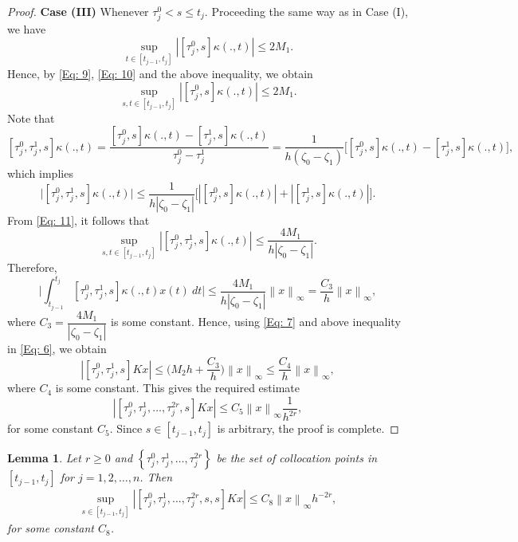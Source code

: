 \documentclass[sn-mathphys-num]{sn-jnl}%
\theoremstyle{thmstyleone}%
\theoremstyle{thmstyletwo}%
\theoremstyle{thmstylethree}%
\newcommand{\norm}[1]{\left\lVert #1\right\rVert}
\newtheorem{lemma}{\bf Lemma}[section]
\begin{document}
\begin{proof}
	\noindent
	\textbf{Case (III)}
	Whenever $\tau_j^0<s \le t_j$. Proceeding the same way as in Case (I), we have
	\begin{equation*}
		\sup_{t \in [t_{j-1},t_j]}\left|[\tau_j^0,s]\kappa(.,t)\right| \le 2M_1.
	\end{equation*}
	Hence, by \eqref{Eq: 9}, \eqref{Eq: 10} and the above inequality, we obtain
	\begin{equation}\label{Eq: 11}
		\sup_{s,t \in [t_{j-1},t_j]}\left|[\tau_j^0,s]\kappa(.,t)\right| \le 2M_1.
	\end{equation}
	Note that
	$$
	[\tau_j^0,\tau_j^1,s]\kappa(.,t) =\dfrac{[\tau_j^0,s]\kappa(.,t)-[\tau_j^1,s]\kappa(.,t)}{\tau_j^0-\tau_j^1} 
	= \dfrac{1}{h(\zeta_0-\zeta_1)} \bigg [ [\tau_j^0,s]\kappa(.,t)-[\tau_j^1,s]\kappa(.,t) \bigg ],
	$$
	which implies
	$$
	\bigg |[\tau_j^0,\tau_j^1,s]\kappa(.,t) \bigg| \le \dfrac{1}{h |\zeta_0-\zeta_1|} \bigg [ \left |[\tau_j^0,s]\kappa(.,t)\right |+\left |[\tau_j^1,s]\kappa(.,t) \right | \bigg ].
	$$
	From \eqref{Eq: 11}, it follows that
	$$
	\sup_{s,t \in [t_{j-1},t_j]}\left|[\tau_j^0,\tau_j^1,s]\kappa(.,t)\right| \le \dfrac{4M_1}{h |\zeta_0-\zeta_1|}.
	$$
	Therefore, 
	$$
	\bigg |\int_{t_{j-1}}^{t_j} [\tau_j^0,\tau_j^1,s] \kappa(.,t) x(t) ~dt \bigg | 
	\le \dfrac{4M_1}{h |\zeta_0-\zeta_1|}\norm{x}_\infty =  \dfrac{C_3}{h}\norm{x}_\infty,
	$$
	where $C_3=\dfrac{4M_1}{|\zeta_0-\zeta_1|}$ is some constant.
	Hence, using \eqref{Eq: 7} and above inequality in \eqref{Eq: 6}, we obtain
	$$
	\left|[\tau_j^0,\tau_j^1,s]Kx \right| \le \bigg ( M_2 h + \dfrac{C_3}{h}\bigg)\norm{x}_\infty \le \dfrac{C_4}{h}\norm{x}_\infty,
	$$
	where $C_4$ is some constant. This gives the required estimate
	$$
	\left|[\tau_j^0,\tau_j^1,\ldots, \tau_j^{2r}, s]Kx \right| \le C_5 \norm{x}_\infty \dfrac{1}{h^{2r}},
	$$
	for some constant $C_5$. Since $s \in [t_{j-1},t_j]$ is arbitrary, the proof is complete.
\end{proof}

\begin{lemma} \label{le2}
	Let $r \ge 0$ and $\left\{\tau_j^0, \tau_j^1, \ldots, \tau_j^{2r} \right\}$ be the set of collocation points in $[t_{j-1}, t_j]$ for $j = 1, 2, \ldots, n$. Then
	\begin{eqnarray*}
		\sup_{s \in [t_{j-1}, t_j]}	\left|\left[\tau_j^0, \tau_j^1, \ldots, \tau_j^{2r}, s, s \right]K x\right| \leq C_8 \norm{x}_\infty h^{-2r},
	\end{eqnarray*}
	for some constant $C_8$.
\end{lemma}
\end{document}
